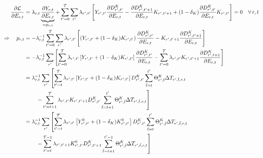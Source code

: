 \documentclass[preprint,3p,authoryear]{elsarticle}
\begin{document}
\begin{align}
  \label{eq:partE}
  \frac{\partial\mcL}{\partial E_{r,t}} &= \lambda_{r,t}\underbrace{\frac{\partial Y_{r,t}}{\partial E_{r,t}}}_{=p_{r,t}}+ \sum_{t'=0}^{\T}\sum_{r'}\lambda_{r',t'}\left[Y_{r',t'}\frac{\partial \DK_{r',t'}}{\partial E_{r,t}}-\pf{\DK_{r',t'+1}}{E_{r,t}}K_{r',t'+1}+(1-\delta_K)\pf{\DK_{r',t'}}{E_{r,t}}K_{r',t'}\right]=0\quad\forall\,r,t\notag\\
  \Rightarrow \quad p_{r,t} &= -\lambda_{r,t}^{-1}\sum_{t'=0}^{\T}\sum_{r'}\lambda_{r',t'}\left[\left(Y_{r',t'}+(1-\delta_K)K_{r',t'}\right)\pf{\DK_{r',t'}}{ E_{r,t}}-K_{r',t'+1}\pf{\DK_{r',t'+1}}{E_{r,t}}\right]\notag\\
                                        &=                                          -\lambda_{r,t}^{-1}\sum_{r'}\left[\sum_{t'=0}^{\T}\lambda_{r',t'}\left[Y_{r',t'}+(1-\delta_K)K_{r',t'}\right]\pf{\DK_{r',t'}}{ E_{r,t}}- \sum_{t'=0}^{\T} \lambda_{r',t'}K_{r',t'+1}\pf{\DK_{r',t+1}}{E_{r,t}}\right]\notag\\
                                        &=                                          \lambda_{r,t}^{-1}\sum_{r'}\left[\sum_{t'=t}^{\T}\lambda_{r',t'}\left[Y_{r',t'}+(1-\delta_K)K_{r',t'}\right]\DK_{r',t'}\sum_{\tilde{t}=t}^{t'}\Theta^{K}_{r',\tilde{t}}\Delta T_{r',\tilde{t},r,t}\right.\\                                        &\qquad\,\left.-\sum_{t'=t+1}^{\T}\lambda_{r',t'}K_{r',t'+1}\DK_{r',t'}\sum_{\tilde{t}=t+1}^{t'}\Theta^{K}_{r',\tilde{t}}\Delta T_{r',\tilde{t},r,t}\right]\notag\\
  &=    \lambda_{r,t}^{-1}\sum_{r'}\left[\sum_{t'=t}^{\T}\lambda_{r',t'}\left[Y^0_{r',t'}+(1-\delta_K)K^0_{r',t'}\right]\DK_{r',t'}\sum_{\tilde{t}=t}^{t'}\Theta^{K}_{r',\tilde{t}}\Delta T_{r',\tilde{t},r,t}\right.\\ &\qquad\,\left.-\sum_{t'=t}^{\T-1}\lambda_{r',t'+1}K^0_{r',t'}\DK_{r',t'+1}\sum_{\tilde{t}=t+1}^{t'-1}\Theta^{K}_{r',\tilde{t}}\Delta T_{r',\tilde{t},r,t}\right]\notag\\                                         %

\end{align}
\end{document}
